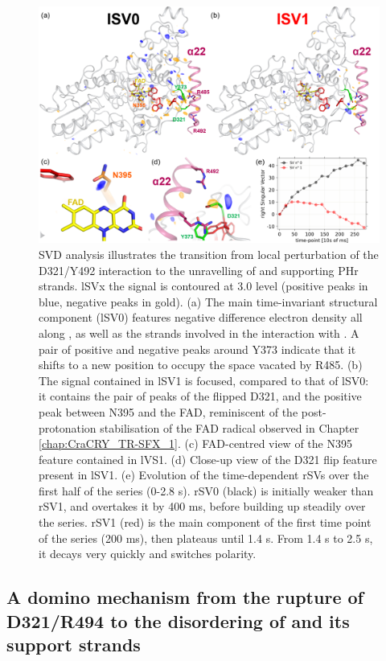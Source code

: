 \begin{figure}[H]
  \centering
  \includegraphics[width=\textwidth]{images/cracry/TR-SOX_SVD.pdf}
  \hfill
  \caption{SVD analysis illustrates the transition from local perturbation of the D321/Y492 interaction to the unravelling of  and supporting PHr strands. lSVx the signal is contoured at 3.0 \textsigma level (positive peaks in blue, negative peaks in gold). (a) The main time-invariant structural component (lSV0) features negative difference electron density all along , as well as the strands involved in the interaction with . A pair of positive and negative peaks around Y373 indicate that it shifts to a new position to occupy the space vacated by R485. (b) The signal contained in lSV1 is focused, compared to that of lSV0: it contains the pair of peaks of the flipped D321, and the positive peak between N395 and the FAD, reminiscent of the post-protonation stabilisation of the FAD radical observed in Chapter \ref{chap:CraCRY_TR-SFX_1}. (c) FAD-centred view of the N395 feature contained in lVS1. (d) Close-up view of the D321 flip feature present in lSV1. (e) Evolution of the time-dependent rSVs over the first half of the series (0-2.8 s). rSV0 (black) is initially weaker than rSV1, and overtakes it by 400 ms, before building up steadily over the series. rSV1 (red) is the main component of the first time point of the series (200 ms), then plateaus until 1.4 s. From 1.4 s to 2.5 s, it decays very quickly and switches polarity.}\label{fig:TR-SOX_SVD}
\end{figure}

\subsection{A domino mechanism from the rupture of D321/R494 to the disordering of  and its support strands}


